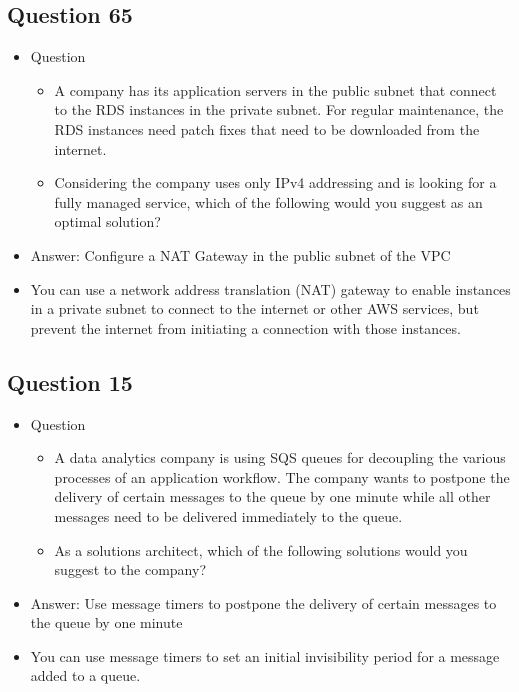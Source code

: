 \documentclass[]{scrartcl}
\begin{document}
\subsection{Question 65}
\begin{itemize}
	\item Question
	\begin{itemize}
		\item A company has its application servers in the public subnet that connect to the RDS instances in the private subnet. For regular maintenance, the RDS instances need patch fixes that need to be downloaded from the internet.
		\item Considering the company uses only IPv4 addressing and is looking for a fully managed service, which of the following would you suggest as an optimal solution?
	\end{itemize}
	\item Answer: Configure a NAT Gateway in the public subnet of the VPC
	\item You can use a network address translation (NAT) gateway to enable instances in a private subnet to connect to the internet or other AWS services, but prevent the internet from initiating a connection with those instances. 
\end{itemize}

\subsection{Question 15}
\begin{itemize}
	\item Question
	\begin{itemize}
		\item A data analytics company is using SQS queues for decoupling the various processes of an application workflow. The company wants to postpone the delivery of certain messages to the queue by one minute while all other messages need to be delivered immediately to the queue.
		\item As a solutions architect, which of the following solutions would you suggest to the company?
	\end{itemize}
	\item Answer: Use message timers to postpone the delivery of certain messages to the queue by one minute
	\item You can use message timers to set an initial invisibility period for a message added to a queue.
\end{itemize}
\end{document}

